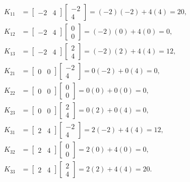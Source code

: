 \documentclass{article}
\numberwithin{equation}{section}
\numberwithin{table}{section}
\begin{document}
\begin{align*}
    K_{11}
    &=\begin{bmatrix}-2&4\end{bmatrix}\begin{bmatrix}-2\\4\end{bmatrix}
      =(-2)(-2)+4(4)=20,\\
    K_{12}
    &=\begin{bmatrix}-2&4\end{bmatrix}\begin{bmatrix}0\\0\end{bmatrix}
      =(-2)(0)+4(0)=0,\\
    K_{13}
    &=\begin{bmatrix}-2&4\end{bmatrix}\begin{bmatrix}2\\4\end{bmatrix}
      =(-2)(2)+4(4)=12,\\
    K_{21}
    &=\begin{bmatrix}0&0\end{bmatrix}\begin{bmatrix}-2\\4\end{bmatrix}
      =0(-2)+0(4)=0,\\
    K_{22}
    &=\begin{bmatrix}0&0\end{bmatrix}\begin{bmatrix}0\\0\end{bmatrix}
      =0(0)+0(0)=0,\\
    K_{23}
    &=\begin{bmatrix}0&0\end{bmatrix}\begin{bmatrix}2\\4\end{bmatrix}
      =0(2)+0(4)=0,\\
    K_{31}
    &=\begin{bmatrix}2&4\end{bmatrix}\begin{bmatrix}-2\\4\end{bmatrix}
      =2(-2)+4(4)=12,\\
    K_{32}
    &=\begin{bmatrix}2&4\end{bmatrix}\begin{bmatrix}0\\0\end{bmatrix}
      =2(0)+4(0)=0,\\
    K_{33}
    &=\begin{bmatrix}2&4\end{bmatrix}\begin{bmatrix}2\\4\end{bmatrix}
      =2(2)+4(4)=20.
\end{align*}
\end{document}
